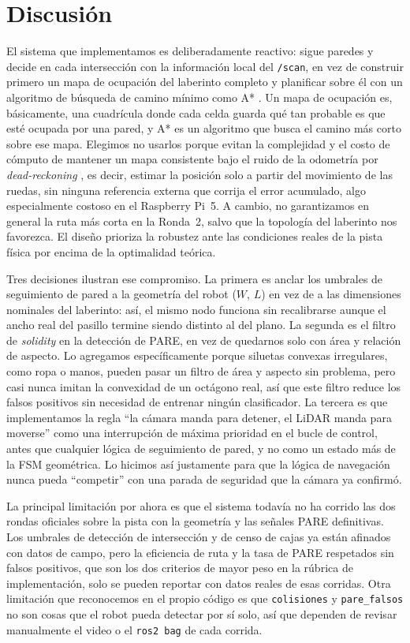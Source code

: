 \documentclass[conference]{IEEEtran}
\begin{document}
\section{Discusión}

El sistema que implementamos es deliberadamente reactivo: sigue paredes y decide en cada intersección con la información local del \texttt{/scan}, en vez de construir primero un mapa de ocupación \cite{elfes1989occupancy} del laberinto completo y planificar sobre él con un algoritmo de búsqueda de camino mínimo como A* \cite{hart1968formal}. Un mapa de ocupación es, básicamente, una cuadrícula donde cada celda guarda qué tan probable es que esté ocupada por una pared, y A* es un algoritmo que busca el camino más corto sobre ese mapa. Elegimos no usarlos porque evitan la complejidad y el costo de cómputo de mantener un mapa consistente bajo el ruido de la odometría por \emph{dead-reckoning} \cite{thrun2005probabilistic}, es decir, estimar la posición solo a partir del movimiento de las ruedas, sin ninguna referencia externa que corrija el error acumulado, algo especialmente costoso en el Raspberry Pi~5. A cambio, no garantizamos en general la ruta más corta en la Ronda~2, salvo que la topología del laberinto nos favorezca. El diseño prioriza la robustez ante las condiciones reales de la pista física por encima de la optimalidad teórica.

Tres decisiones ilustran ese compromiso. La primera es anclar los umbrales de seguimiento de pared a la geometría del robot ($W$, $L$) en vez de a las dimensiones nominales del laberinto: así, el mismo nodo funciona sin recalibrarse aunque el ancho real del pasillo termine siendo distinto al del plano. La segunda es el filtro de \emph{solidity} en la detección de PARE, en vez de quedarnos solo con área y relación de aspecto. Lo agregamos específicamente porque siluetas convexas irregulares, como ropa o manos, pueden pasar un filtro de área y aspecto sin problema, pero casi nunca imitan la convexidad de un octágono real, así que este filtro reduce los falsos positivos sin necesidad de entrenar ningún clasificador. La tercera es que implementamos la regla ``la cámara manda para detener, el LiDAR manda para moverse'' como una interrupción de máxima prioridad en el bucle de control, antes que cualquier lógica de seguimiento de pared, y no como un estado más de la FSM geométrica. Lo hicimos así justamente para que la lógica de navegación nunca pueda ``competir'' con una parada de seguridad que la cámara ya confirmó.

La principal limitación por ahora es que el sistema todavía no ha corrido las dos rondas oficiales sobre la pista con la geometría y las señales PARE definitivas. Los umbrales de detección de intersección y de censo de cajas ya están afinados con datos de campo, pero la eficiencia de ruta y la tasa de PARE respetados sin falsos positivos, que son los dos criterios de mayor peso en la rúbrica de implementación, solo se pueden reportar con datos reales de esas corridas. Otra limitación que reconocemos en el propio código es que \texttt{colisiones} y \texttt{pare\_falsos} no son cosas que el robot pueda detectar por sí solo, así que dependen de revisar manualmente el video o el \texttt{ros2 bag} de cada corrida.
\end{document}
